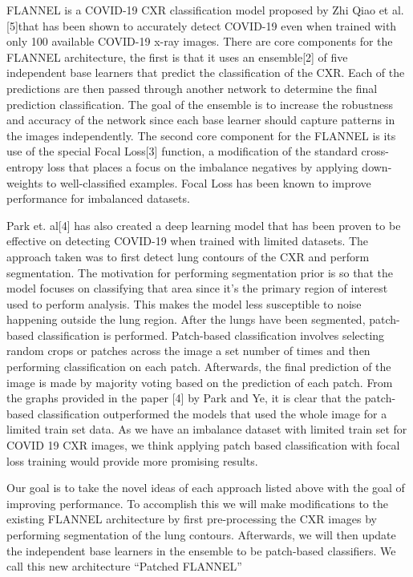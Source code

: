 \documentclass{sigkddExp}
\begin{document}
FLANNEL is a COVID-19 CXR classification model proposed by Zhi Qiao et al. [5]that has been shown to accurately detect COVID-19 even when trained with only 100 available COVID-19 x-ray images. There are core components for the FLANNEL architecture, the first is that it uses an ensemble[2] of five independent base learners that predict the classification of the CXR. Each of the predictions are then passed through another network to determine the final prediction classification. The goal of the ensemble is to increase the robustness and accuracy of the network since each base learner should capture patterns in the images independently. The second core component for the FLANNEL is its use of the special Focal Loss[3] function, a modification of the standard cross-entropy loss that places a focus on the imbalance negatives by applying down-weights to well-classified examples. Focal Loss has been known to improve performance for imbalanced datasets.

Park et. al[4] has also created a deep learning model that has been proven to be effective on detecting COVID-19 when trained with limited datasets. The approach taken was to first detect lung contours of the CXR and perform segmentation. The motivation for performing segmentation prior is so that the model focuses on classifying that area since it’s the primary region of interest used to perform analysis. This makes the model less susceptible to noise happening outside the lung region. After the lungs have been segmented, patch-based classification is performed. Patch-based classification involves selecting random crops or patches across the image a set number of times and then performing classification on each patch. Afterwards, the final prediction of the image is made by majority voting based on the prediction of each patch. From the graphs provided in the paper [4] by Park and Ye, it is clear that the patch-based classification outperformed the models that used the whole image for a limited train set data. As we have an imbalance dataset with limited train set for COVID 19 CXR images, we think applying patch based classification with focal loss training would provide more promising results.

Our goal is to take the novel ideas of each approach listed above with the goal of improving performance. To accomplish this we will make modifications to the existing FLANNEL architecture by first pre-processing the CXR images by performing segmentation of the lung contours. Afterwards, we will then update the independent base learners in the ensemble to be patch-based classifiers. We call this new architecture “Patched FLANNEL”
\end{document}
